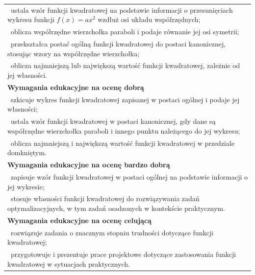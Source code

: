 \documentclass[12pt,a4paper]{article}
\begin{document}
\begin{longtable}{|p{16cm}|}
		\textbullet\ ustala wzór funkcji kwadratowej na podstawie informacji o przesunięciach wykresu funkcji $f(x)=ax^2$ wzdłuż osi układu współrzędnych; \\
		
		\textbullet\ oblicza współrzędne wierzchołka paraboli i podaje równanie jej osi symetrii; \\
		
		\textbullet\ przekształca postać ogólną funkcji kwadratowej do postaci kanonicznej, stosując wzory na współrzędne wierzchołka; \\
		
		\textbullet\ oblicza najmniejszą lub największą wartość funkcji kwadratowej, zależnie od jej własności. \\ \hline
		
		\textbf{Wymagania edukacyjne na ocenę dobrą} \\ \hline
		
		\textbullet\ szkicuje wykres funkcji kwadratowej zapisanej w postaci ogólnej i podaje jej własności; \\
		
		\textbullet\ ustala wzór funkcji kwadratowej w postaci kanonicznej, gdy dane są współrzędne wierzchołka paraboli i innego punktu należącego do jej wykresu; \\
		
		\textbullet\ oblicza najmniejszą i największą wartość funkcji kwadratowej w przedziale domkniętym. \\ \hline
		
		\textbf{Wymagania edukacyjne na ocenę bardzo dobrą} \\ \hline
		
		\textbullet\ zapisuje wzór funkcji kwadratowej w postaci ogólnej na podstawie informacji o jej wykresie; \\
		
		\textbullet\ stosuje własności funkcji kwadratowej do rozwiązywania zadań optymalizacyjnych, w tym zadań osadzonych w kontekście praktycznym. \\ \hline
		
		\textbf{Wymagania edukacyjne na ocenę celującą} \\ \hline
		
		\textbullet\ rozwiązuje zadania o znacznym stopniu trudności dotyczące funkcji kwadratowej; \\
		
		\textbullet\ przygotowuje i prezentuje prace projektowe dotyczące zastosowania funkcji kwadratowej w sytuacjach praktycznych. \\ \hline
		
	\end{longtable}
	
\end{document}
